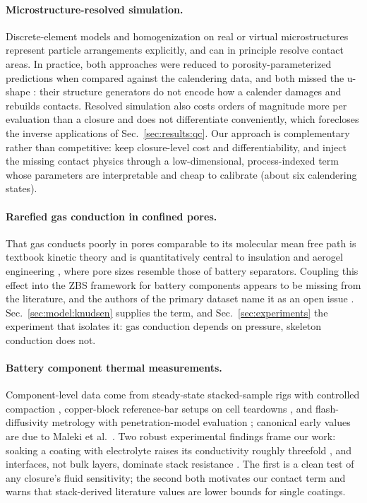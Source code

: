 \documentclass[10pt,a4paper]{article}
\begin{document}
\paragraph{Microstructure-resolved simulation.}
Discrete-element models \cite{sangros2017} and homogenization on real or virtual microstructures \cite{oehler2021} represent particle arrangements explicitly, and can in principle resolve contact areas. In practice, both approaches were reduced to porosity-parameterized predictions when compared against the calendering data, and both missed the u-shape \cite{gandert2023}: their structure generators do not encode how a calender damages and rebuilds contacts. Resolved simulation also costs orders of magnitude more per evaluation than a closure and does not differentiate conveniently, which forecloses the inverse applications of Sec.~\ref{sec:results:qc}. Our approach is complementary rather than competitive: keep closure-level cost and differentiability, and inject the missing contact physics through a low-dimensional, process-indexed term whose parameters are interpretable and cheap to calibrate (about six calendering states).

\paragraph{Rarefied gas conduction in confined pores.}
That gas conducts poorly in pores comparable to its molecular mean free path is textbook kinetic theory \cite{kennard1938} and is quantitatively central to insulation and aerogel engineering \cite{kaganer1969}, where pore sizes resemble those of battery separators. Coupling this effect into the ZBS framework for battery components appears to be missing from the literature, and the authors of the primary dataset name it as an open issue \cite{gandert2023}. Sec.~\ref{sec:model:knudsen} supplies the term, and Sec.~\ref{sec:experiments} the experiment that isolates it: gas conduction depends on pressure, skeleton conduction does not.

\paragraph{Battery component thermal measurements.}
Component-level data come from steady-state stacked-sample rigs with controlled compaction \cite{burheim2013,richter2017}, copper-block reference-bar setups on cell teardowns \cite{marconnet2018,vishwakarma2015}, and flash-diffusivity metrology with penetration-model evaluation \cite{mcmasters,gandert2023}; canonical early values are due to Maleki et al.\ \cite{maleki1999}. Two robust experimental findings frame our work: soaking a coating with electrolyte raises its conductivity roughly threefold \cite{burheim2013,marconnet2018}, and interfaces, not bulk layers, dominate stack resistance \cite{vishwakarma2015}. The first is a clean test of any closure's fluid sensitivity; the second both motivates our contact term and warns that stack-derived literature values are lower bounds for single coatings.
\end{document}
